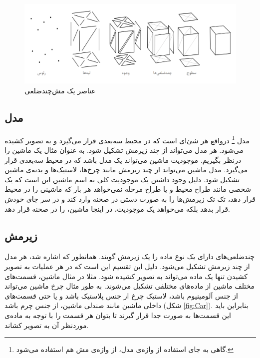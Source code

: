 \begin{figure}[ht]
	\centerline{\includegraphics[width=\textwidth,height=\textheight,keepaspectratio]{Figures/Ch2/Mesh.png}}

	\caption{عناصر یک مش‌چندضلعی\cite{PolygonMeshWikipedia}}
	\label{fig:PolygonMesh}
\end{figure}


\subsection{مدل}

مدل‌
\footnote{ گاهی به جای استفاده از واژه‌ی مدل، از واژه‌ی مش هم استفاده می‌شود.}
درواقع هر شئ‌ای است که در محیط سه‌بعدی قرار می‌گیرد و به تصویر کشیده ‌می‌شود. هر مدل می‌تواند از چند زیرمش تشکیل شود.
به عنوان مثال یک ماشین را درنظر بگیریم. موجودیت ماشین می‌تواند یک مدل باشد که در محیط سه‌بعدی قرار می‌گیرد. مدل ماشین می‌تواند از چند زیرمش مانند چرخ‌ها، لاستیک‌ها و بدنه‌ی ماشین تشکیل شود. دلیل وجود داشتن یک موجودیت کلی به اسم ماشین این است که یک ‌شخصی مانند طراح محیط و یا طراح مرحله ‌نمی‌خواهد هر بار که ماشینی را در محیط قرار دهد، تک تک زیرمش‌ها را به صورت دستی در صحنه وارد کند و در سر جای خودش قرار بدهد
بلکه می‌خواهد یک موجودیت، در اینجا ماشین، را در صحنه قرار دهد.


\subsection{زیرمش
\protect{}
}
چندضلعی‌های دارای یک نوع ماده
را یک زیرمش گویند.
همانطور که اشاره شد، هر مدل از چند زیرمش تشکیل می‌شود. دلیل این تقسیم این است که در هر عملیات به تصویر کشیدن
تنها یک ماده می‌تواند به تصویر کشیده شود. مثلا در مثال ماشین، قسمت‌های مختلف ماشین از ماده‌های مختلفی تشکیل می‌شوند. به طور مثال چرخ ماشین می‌تواند از جنس آلومینیوم باشد، لاستیک چرخ از جنس پلاستیک باشد و یا حتی قسمت‌های داخلی ماشین مانند صندلی ماشین، از جنس چرم باشد
(شکل \ref{fig:Car}).
بنابراین باید این قسمت‌ها به صورت جدا قرار گیرند تا بتوان هر قسمت را با توجه به ماده‌ی موردنظر آن به تصویر کشاند.


